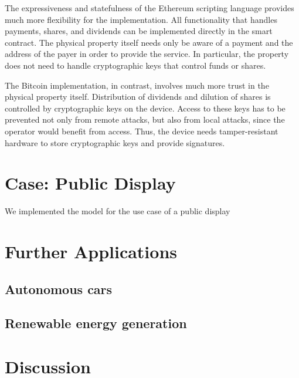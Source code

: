 The expressiveness and statefulness of the Ethereum scripting language provides much more flexibility for the implementation. All functionality that handles payments, shares, and dividends can be implemented directly in the smart contract. The physical property itself needs  only be aware of a payment and the address of the payer in order to provide the service. In particular, the property does not need to handle cryptographic keys that control funds or shares.

The Bitcoin implementation, in contrast, involves much more trust in the physical property itself.
Distribution of dividends and dilution of shares is controlled by cryptographic keys on the device. Access to these keys has to be prevented not only from remote attacks, but also from local attacks, since the operator would benefit from access. Thus, the device needs tamper-resistant hardware to store cryptographic keys and provide signatures.
 
\section{Case: Public Display}

We implemented the model for the use case of a public display

\section{Further Applications}

\subsection{Autonomous cars}

\subsection{Renewable energy generation}


\section{Discussion}

\subsection{}

